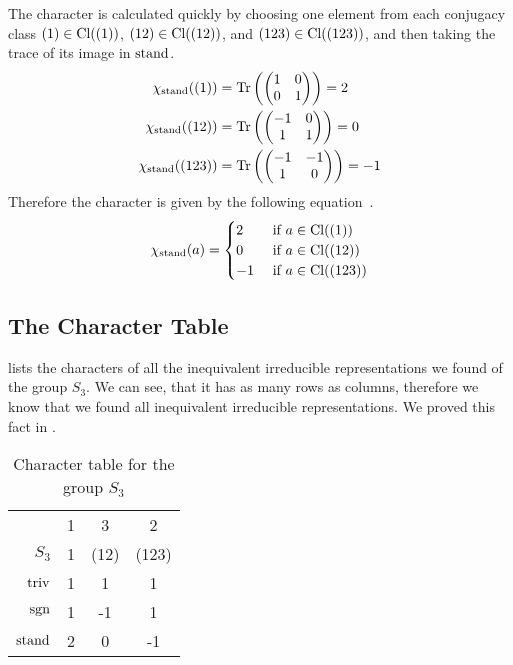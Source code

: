 The character is calculated quickly by choosing one element from each conjugacy class $(1) \in \operatorname{Cl}((1))$, $(12) \in \operatorname{Cl}((12))$, and $(123) \in \operatorname{Cl}((123))$, and then taking the trace of its image in $\operatorname{stand}$.
\begin{subequations}
\begin{align}
    \chi_{\operatorname{stand}}((1)) & = \operatorname{Tr}\left( \begin{pmatrix}
        1 & 0 \\
        0 & 1
    \end{pmatrix} \right) = 2 \\
    \chi_{\operatorname{stand}}((12)) & = \operatorname{Tr}\left( \begin{pmatrix}
        -1 & 0 \\
        1 & 1
    \end{pmatrix} \right) = 0 \\
    \chi_{\operatorname{stand}}((123)) & = \operatorname{Tr}\left( \begin{pmatrix}
        -1 & -1 \\
        1 & 0
    \end{pmatrix} \right) = -1
\end{align}
\end{subequations}
Therefore the character is given by the following equation~\cite{fulton2013}.
\begin{align}
    \chi_{\operatorname{stand}}(a) = \begin{cases}
        2 & \text{ if } a \in \operatorname{Cl}((1)) \\
        0 & \text{ if } a \in \operatorname{Cl}((12)) \\
        -1 & \text{ if } a \in \operatorname{Cl}((123))
    \end{cases}
\end{align}

\subsection{The Character Table}

 lists the characters of all the inequivalent irreducible representations we found of the group $S_3$.
We can see, that it has as many rows as columns, therefore we know that we found all inequivalent irreducible representations.
We proved this fact in .

\begin{table}[h]
    \centering

    \begin{tabular}{r | c  c  c}
                    & 1 & 3     & 2     \\
        $S_3$       & 1 & (12)  & (123) \\ \hline
        $\operatorname{triv}$     & 1 & 1     & 1     \\
        $\operatorname{sgn}$      & 1 & -1    & 1     \\
        $\operatorname{stand}$    & 2 & 0     & -1
    \end{tabular}

    \caption{Character table for the group $S_3$}
    \label{tab:reprep.char.table}
\end{table}

